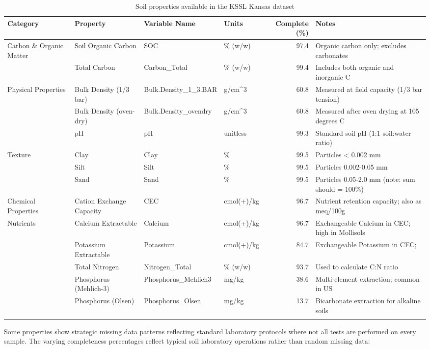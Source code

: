 \documentclass[
  10pt,
  b5paper,
  oneside]{book}
\begin{document}
\begin{table}

\caption{\label{tab:table-properties}Soil properties available in the KSSL Kansas dataset}
\centering
\begin{tabular}[t]{llllrl}
\toprule
Category & Property & Variable Name & Units & Complete (\%) & Notes\\
\midrule
Carbon \& Organic Matter & Soil Organic Carbon & SOC & \% (w/w) & 97.4 & Organic carbon only; excludes carbonates\\
 & Total Carbon & Carbon\_Total & \% (w/w) & 99.4 & Includes both organic and inorganic C\\
Physical Properties & Bulk Density (1/3 bar) & Bulk.Density\_1\_3.BAR & g/cm\textasciicircum{}3 & 60.8 & Measured at field capacity (1/3 bar tension)\\
 & Bulk Density (oven-dry) & Bulk.Density\_ovendry & g/cm\textasciicircum{}3 & 60.8 & Measured after oven drying at 105 degrees C\\
 & pH & pH & unitless & 99.3 & Standard soil pH (1:1 soil:water ratio)\\
\addlinespace
Texture & Clay & Clay & \% & 99.5 & Particles < 0.002 mm\\
 & Silt & Silt & \% & 99.5 & Particles 0.002-0.05 mm\\
 & Sand & Sand & \% & 99.5 & Particles 0.05-2.0 mm (note: sum should = 100\%)\\
Chemical Properties & Cation Exchange Capacity & CEC & cmol(+)/kg & 96.7 & Nutrient retention capacity; also as meq/100g\\
Nutrients & Calcium Extractable & Calcium & cmol(+)/kg & 96.7 & Exchangeable Calcium in CEC; high in Mollisols\\
\addlinespace
 & Potassium Extractable & Potassium & cmol(+)/kg & 84.7 & Exchangeable Potassium in CEC;\\
 & Total Nitrogen & Nitrogen\_Total & \% (w/w) & 93.7 & Used to calculate C:N ratio\\
 & Phosphorus (Mehlich-3) & Phosphorus\_Mehlich3 & mg/kg & 38.6 & Multi-element extraction; common in US\\
 & Phosphorus (Olsen) & Phosphorus\_Olsen & mg/kg & 13.7 & Bicarbonate extraction for alkaline soils\\
 &  &  &  &  & \\
\bottomrule
\end{tabular}
\end{table}

Some properties show strategic missing data patterns reflecting standard laboratory protocols where not all tests are performed on every sample. The varying completeness percentages reflect typical soil laboratory operations rather than random missing data:
\end{document}

